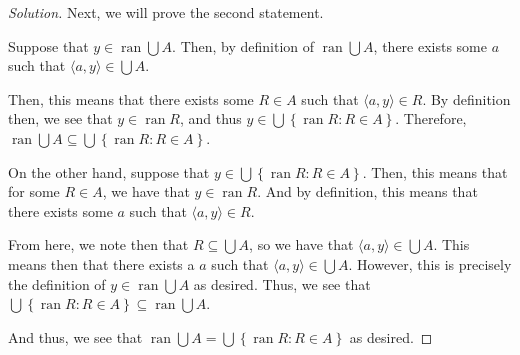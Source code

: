 \documentclass{article}
\newenvironment{solution}{\begin{proof}[Solution]}{\end{proof}}
\renewcommand\qedsymbol{$\blacksquare$}
\newenvironment{innerproof}{\renewcommand{\qedsymbol}{$\square$}\proof}{\endproof}
\DeclareMathOperator*{\ran}{\mathrm{ran}}
\newcommand{\pr}[1]{\left( {#1} \right)}
\newcommand{\brc}[1]{ \left\{  {#1} \right\}}
\newcommand{\ang}[1]{\langle {#1} \rangle}
\begin{document}
\begin{solution}
		Next, we will prove the second statement.
		\begin{innerproof}
			\begin{comment}
				We note that this proof is similar to the previous one. Suppose that $y \in \ran \bigcup A = \bigcup \brc{\ran R : R \in A}$. Then, there exists some $R \in \bigcup A$ such that $\ang{a,y} \in R$. Then, by definition, we see that $y \in \ran R$, and thus $y \in \bigcup \brc{\ran R: R \in A}$. Thus, $\ran \bigcup A \subseteq \bigcup \brc{\ran R : R \in A}$.
				
				On the other hand, 
				
				Then, 
			\end{comment}
			Suppose that $y \in \ran \bigcup A$. Then, by definition of $\ran \bigcup A$, there exists some $a$ such that $\ang{a,y} \in \bigcup A$.
			
			Then, this means that there exists some $R \in A$ such that $\ang{a,y} \in R$. By definition then, we see that $y \in \ran R$, and thus $y \in \bigcup \brc{\ran R : R \in A}$. Therefore, $\ran \bigcup A \subseteq \bigcup \brc{\ran R : R \in A}$.
			
			On the other hand, suppose that $y \in \bigcup \brc{\ran R : R \in A}$. Then, this means that for some $R \in A$, we have that $y \in \ran R$. And by definition, this means that there exists some $a$ such that $\ang{a,y} \in R$.
			
			From here, we note then that $R \subseteq \bigcup A$, so we have that $\ang{a,y} \in \bigcup A$. This means then that there exists a $a$ such that $\ang{a,y} \in \bigcup A$. However, this is precisely the definition of $y \in \ran \bigcup A$ as desired. Thus, we see that $\bigcup \brc{\ran R : R \in A} \subseteq \ran \bigcup A$.
			\begin{comment}
				\begin{align*}
					y \in \ran \bigcup A &\iff y \in \brc{t : \exists a\pr{\ang{a,t} \in \bigcup A}} \\
					&\iff y \in \brc{t : \exists a\exists R\pr{\pr{\ang{a,t} \in R} \land \pr{R \in A}}} \\
					&\iff \exists R\pr{\pr{y \in \ran R} \land \pr{R \in A}} \\
					&\iff y \in \bigcup \brc{\ran R : R \in A}.
				\end{align*}
			\end{comment}
			
			And thus, we see that $\ran \bigcup A = \bigcup \brc{\ran R : R \in A}$ as desired.
		\end{innerproof}
	\end{solution}
\end{document}
